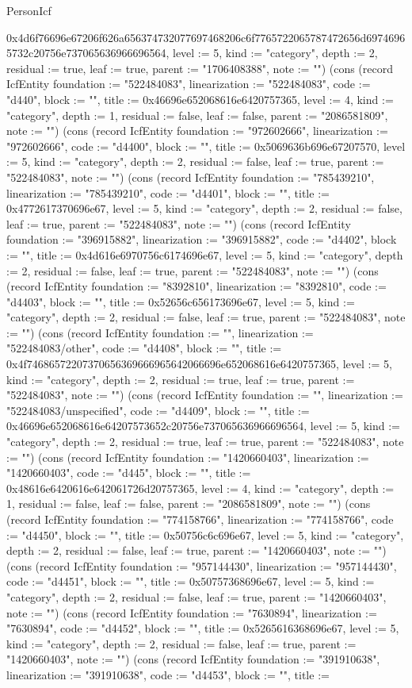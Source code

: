 \begin{lexlean}{PersonIcf}
\begin{semanticmodule}
{0x4d6f76696e67206f626a656374732077697468206c6f7765722065787472656d69746965732c20756e737065636966696564, level := 5, kind := "category", depth := 2, residual := true, leaf := true, parent := "1706408388", note := ""}) (cons (record IcfEntity {foundation := "522484083", linearization := "522484083", code := "d440", block := "", title := 0x46696e652068616e6420757365, level := 4, kind := "category", depth := 1, residual := false, leaf := false, parent := "2086581809", note := ""}) (cons (record IcfEntity {foundation := "972602666", linearization := "972602666", code := "d4400", block := "", title := 0x5069636b696e67207570, level := 5, kind := "category", depth := 2, residual := false, leaf := true, parent := "522484083", note := ""}) (cons (record IcfEntity {foundation := "785439210", linearization := "785439210", code := "d4401", block := "", title := 0x4772617370696e67, level := 5, kind := "category", depth := 2, residual := false, leaf := true, parent := "522484083", note := ""}) (cons (record IcfEntity {foundation := "396915882", linearization := "396915882", code := "d4402", block := "", title := 0x4d616e6970756c6174696e67, level := 5, kind := "category", depth := 2, residual := false, leaf := true, parent := "522484083", note := ""}) (cons (record IcfEntity {foundation := "8392810", linearization := "8392810", code := "d4403", block := "", title := 0x52656c656173696e67, level := 5, kind := "category", depth := 2, residual := false, leaf := true, parent := "522484083", note := ""}) (cons (record IcfEntity {foundation := "", linearization := "522484083/other", code := "d4408", block := "", title := 0x4f74686572207370656369666965642066696e652068616e6420757365, level := 5, kind := "category", depth := 2, residual := true, leaf := true, parent := "522484083", note := ""}) (cons (record IcfEntity {foundation := "", linearization := "522484083/unspecified", code := "d4409", block := "", title := 0x46696e652068616e64207573652c20756e737065636966696564, level := 5, kind := "category", depth := 2, residual := true, leaf := true, parent := "522484083", note := ""}) (cons (record IcfEntity {foundation := "1420660403", linearization := "1420660403", code := "d445", block := "", title := 0x48616e6420616e642061726d20757365, level := 4, kind := "category", depth := 1, residual := false, leaf := false, parent := "2086581809", note := ""}) (cons (record IcfEntity {foundation := "774158766", linearization := "774158766", code := "d4450", block := "", title := 0x50756c6c696e67, level := 5, kind := "category", depth := 2, residual := false, leaf := true, parent := "1420660403", note := ""}) (cons (record IcfEntity {foundation := "957144430", linearization := "957144430", code := "d4451", block := "", title := 0x50757368696e67, level := 5, kind := "category", depth := 2, residual := false, leaf := true, parent := "1420660403", note := ""}) (cons (record IcfEntity {foundation := "7630894", linearization := "7630894", code := "d4452", block := "", title := 0x5265616368696e67, level := 5, kind := "category", depth := 2, residual := false, leaf := true, parent := "1420660403", note := ""}) (cons (record IcfEntity {foundation := "391910638", linearization := "391910638", code := "d4453", block := "", title := }
\end{semanticmodule}
\end{lexlean}
